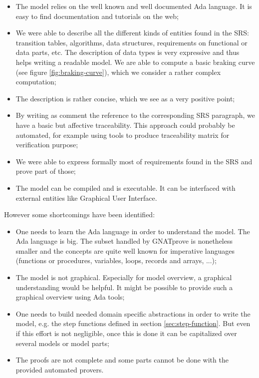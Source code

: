 \documentclass{template/openetcs_report}
\begin{document}
\begin{itemize}
\item The model relies on the well known and well documented Ada
  language. It is easy to find documentation and tutorials on the web;
\item We were able to describe all the different kinds of entities
  found in the SRS: transition tables, algorithms, data structures,
  requirements on functional or data parts, etc. The description of
  data types is very expressive and thus helps writing a readable
  model. We are able to compute a basic braking curve (see figure
  \ref{fig:braking-curve}), which we consider a rather complex
  computation;
\item The description is rather concise, which we see as a very
  positive point;
\item By writing as comment the reference to the corresponding SRS
  paragraph, we have a basic but affective traceability. This approach
  could probably be automated, for example using tools to produce
  traceability matrix for verification purpose;
\item We were able to express formally most of requirements found in
  the SRS and prove part of those;
\item The model can be compiled and is executable. It can be
  interfaced with external entities like Graphical User Interface.
\end{itemize}

However some shortcomings have been identified:
\begin{itemize}
\item One needs to learn the Ada language in order to understand the
  model. The Ada language is big. The subset handled by GNATprove is
  nonetheless smaller and the concepts are quite well known for
  imperative languages (functions or procedures, variables, loops,
  records and arrays, ...);
\item The model is not graphical. Especially for model overview, a
  graphical understanding would be helpful. It might be possible to
  provide such a graphical overview using Ada tools;
\item One needs to build needed domain specific abstractions in order
  to write the model, e.g. the step functions defined in section
  \ref{sec:step-function}. But even if this effort is not negligible,
  once this is done it can be capitalized over several models or model
  parts;
\item The proofs are not complete and some parts cannot be done with
  the provided automated provers.
\end{itemize}
\end{document}
